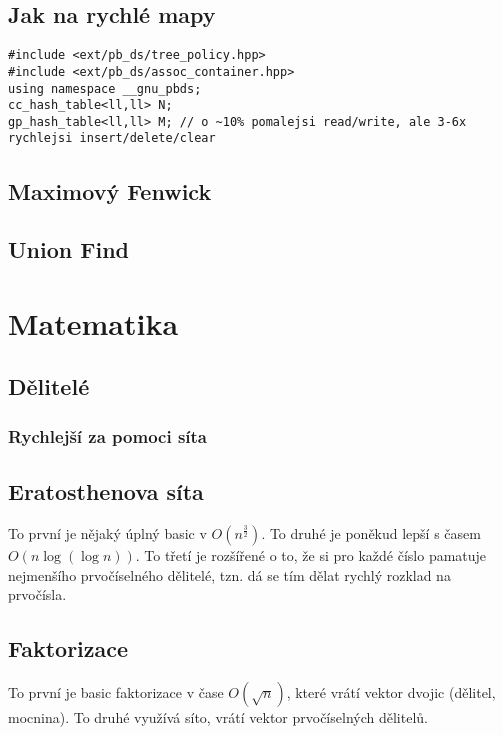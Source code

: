 \documentclass[10pt, a4paper]{article}
\begin{document}
\subsection{Jak na rychlé mapy}
\begin{lstlisting}
#include <ext/pb_ds/tree_policy.hpp>
#include <ext/pb_ds/assoc_container.hpp>
using namespace __gnu_pbds;
cc_hash_table<ll,ll> N;
gp_hash_table<ll,ll> M; // o ~10% pomalejsi read/write, ale 3-6x rychlejsi insert/delete/clear
\end{lstlisting}

\subsection{Maximový Fenwick}


\subsection{Union Find}


\newpage

\section{Matematika}

\subsection{Dělitelé}


\subsubsection{Rychlejší za pomoci síta}


\subsection{Eratosthenova síta}
To první je nějaký úplný basic v $O(n^{\frac{3}{2}})$. To druhé je poněkud lepší s časem $O(n\log(\log n))$. To třetí je rozšířené o to, že si pro každé číslo pamatuje nejmenšího prvočíselného dělitelé, tzn. dá se tím dělat rychlý rozklad na prvočísla.


\subsection{Faktorizace}
To první je basic faktorizace v čase $O(\sqrt n)$, které vrátí vektor dvojic (dělitel, mocnina). To druhé využívá síto, vrátí vektor prvočíselných dělitelů.

\end{document}
